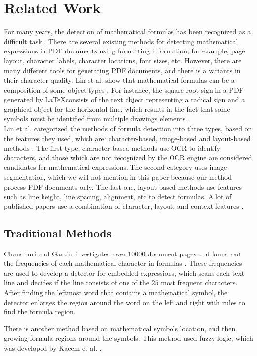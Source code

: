 \section{Related Work}
For many years, the detection of mathematical formulas has been recognized as a difficult task \cite{Chan2000}. There are several existing methods for detecting mathematical expressions in PDF documents using formatting information, for example, page layout, character labels, character locations, font sizes, etc.  However, there are many different tools for generating PDF documents, and there is a variants in their character quality. Lin et al.  show that mathematical formulas can be a composition of some object types \cite{Lin2011}. For instance, the square root sign in a PDF generated by \LaTeX consists of the text object representing a radical sign and a graphical object for the horizontal line, which results in the fact that some symbols must be identified from multiple drawings elements \cite{Mali2020}. \\
Lin et al. categorized the methods of formula detection into three types, based on the features they used, which are: character-based, image-based and layout-based methods  \cite{Lin2011}. The first type, character-based methods use OCR to identify characters, and those which are not recognized by the OCR engine are considered candidates for mathematical expressions. The second category uses image segmentation, which we will not mention in this paper because our method process PDF documents only. The last one, layout-based methods use features such as line height, line spacing, alignment, etc to detect formulas. A lot of published papers use a combination of character, layout, and context features
\cite{Mali2020}.

\subsection{Traditional Methods}
Chaudhuri and Garain investigated over $10000$ document pages and found out the frequencies of each mathematical character in formulas \cite{Chaudhuri1998AnAF}. These frequencies are used to develop a detector for embedded expressions, which scans each text line and decides if the line consists of one of the $25$ most frequent characters. After finding the leftmost word that contains a mathematical symbol, the detector enlarges the region around the word on the left and right with rules to find the formula region.


There is another method based on mathematical symbols location, and then growing formula regions around the symbols. This method used fuzzy logic, which was developed by Kacem et al. \cite{Kacem2001}.

